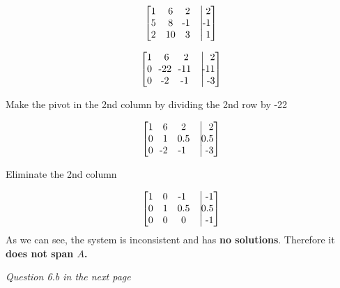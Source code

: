 \documentclass[11pt]{article}
\begin{document}
\begin{center}
\vspace*{-\baselineskip}
\end{center}
\begin{align*}
    \begin{bmatrix}
    1 & 6 & 2 &\bigm|  2\\
    5 & 8 & \llap{-}1 &\bigm| \llap{-}1\\
    2 & 10 & 3 &\bigm| 1
    \end{bmatrix}
\end{align*}
\begin{center}
\end{center}
\vspace*{-\baselineskip}
\begin{align*}
    \begin{bmatrix}
    1 & 6 & 2 &\bigm| \  2\\
    0 &  \llap{-}22 & \llap{-}11 &\bigm| \ \llap{-1}1\\
    0 & \llap{-}2 & \llap{-}1 &\bigm| \ \llap{-}3\\
    \end{bmatrix}
\end{align*}
\begin{center}
    Make the pivot in the 2nd column by dividing the 2nd row by -22
\end{center}
\vspace*{-\baselineskip}
\begin{align*}
    \begin{bmatrix}
    1 & 6 & 2 &\bigm| \ 2\\
    0 & 1 & 0.5 &\bigm| \ \llap{0.}5\\
     0 & \llap{-}2 & \llap{-}1&\bigm| \ \llap{-}3
    \end{bmatrix}\\
\end{align*}
\newpage
\begin{center}
    Eliminate the 2nd column
\end{center}
\vspace*{-\baselineskip}
\begin{align*}
    \begin{bmatrix}
    1 & 0 & \llap{-}1 &\bigm| \ \llap{-}1\\
    0 & 1 & 0.5 &\bigm| \ \llap{0.}5\\
     0 & 0 &0 &\bigm| \ \llap{-}1
    \end{bmatrix}\\
\end{align*}
As we can see, the system is inconsistent and has \textbf{no solutions}. Therefore it \textbf{does not span $A$.}
\vspace{3cm}
   \begin{center}
       \emph{Question 6.b in the next page}
       
   \end{center}
\newpage
\end{document}
